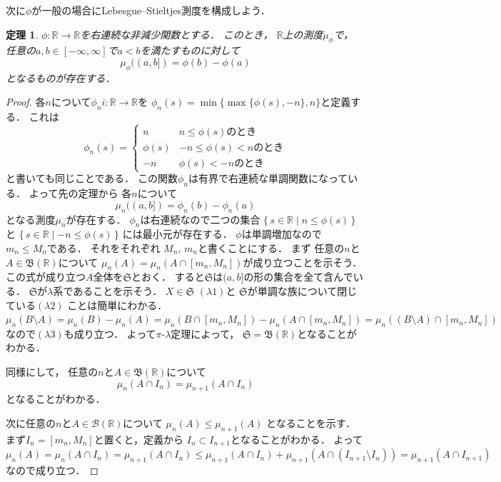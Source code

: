\documentclass[leqno, a4paper, 12pt]{jsarticle}
\newtheorem{thm}{定理}
\newcommand{\rr}{\mathbb{R}}
\begin{document}
次に$\phi$が一般の場合にLebesgue--Stieltjes測度を構成しよう．
\begin{thm}
$\phi:\rr\to \rr$を右連続な非減少関数とする．
このとき，
$\rr$上の測度$\mu_{\phi}$で，
任意の$a, b\in [-\infty, \infty]$で$a<b$を満たすものに対して
\[
\mu_{\phi}((a, b])=\phi(b)-\phi(a)
\]
となるものが存在する．
\end{thm}
\begin{proof}
各$n$について$\phi_{n}i: \rr\to \rr$を
$\phi_{n}(s)=\min \{\max\{\phi(s), -n\}, n\}$と定義する．
これは
\[
\phi_{n}(s)=
\begin{cases}
n & \text{$n\le \phi(s)$のとき}\\
\phi(s) & \text{$-n\le \phi(s)<n$のとき}\\
-n & \text{$\phi(s)< -n$のとき}
\end{cases}
\]
と書いても同じことである．
この関数$\phi_{n}$は有界で右連続な単調関数になっている．
よって先の定理から
各$n$について
\[
\mu_{n}((a, b])=\phi_{n}(b)-\phi_{n}(a)
\]
となる測度$\mu_{n}$が存在する．
$\phi_{n}$は右連続なので二つの集合
$\{\, s\in \rr\mid n\le \phi(s)\, \}$
と
$\{\, s\in \rr\mid -n\le \phi(s)\, \}$
には最小元が存在する．
$\phi$は単調増加なので
$m_{n}\le M_{n}$である．
それをそれぞれ
$M_{n}$, $m_{n}$と書くことにする．
まず
任意の$n$と$A\in \mathfrak{B}(\rr)$について
$\mu_{n}(A)=\mu_{n}(A\cap [m_{n}, M_{n}])$が成り立つことを示そう．
この式が成り立つ$A$全体を$\mathfrak{S}$とおく．
すると$\mathfrak{S}$は$(a, b]$の形の集合を全て含んでいる．
$\mathfrak{S}$が$\lambda$系であることを示そう．
$X\in \mathfrak{S}$ $(\lambda1)$と
$\mathfrak{S}$が単調な族について閉じている$(\lambda2)$
ことは簡単にわかる．
$\mu_{n}(B\setminus A)=\mu_{n}(B)-\mu_{n}(A)=
\mu_{n}(B\cap [m_{n}, M_{n}])-\mu_{n}(A\cap [m_{n}, M_{n}])=
\mu_{n}((B\setminus A)\cap [m_{n}, M_{n}])$
なので$(\lambda 3)$も成り立つ．
よって$\pi$-$\lambda$定理によって，
$\mathfrak{S}=\mathfrak{B}(\rr)$となることがわかる．

同様にして，
任意の$n$と$A\in \mathfrak{B}(\rr)$について
\[
\mu_{n}(A\cap I_{n})=\mu_{n+1}(A\cap I_n)
\]
となることがわかる．

次に任意の$n$と$A\in \mathcal{B}(\rr)$について
$\mu_{n}(A)\le \mu_{n+1}(A)$
となることを示す．
まず$I_{n}=[m_{n}, M_{n}]$と置くと，定義から
$I_{n}\subset I_{n+1}$となることがわかる．
よって
$\mu_{n}(A)=\mu_{n}(A\cap I_n)=
\mu_{n+1}(A\cap I_n)
\le 
\mu_{n+1}(A\cap I_n)+\mu_{n+1}(A\cap (I_{n+1}\setminus I_{n}))
=
\mu_{n+1}(A\cap I_{n+1})$
なので成り立つ．


\end{proof}
\end{document}
